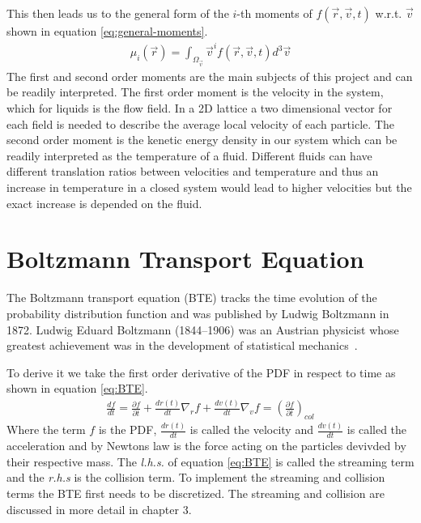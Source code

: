 \documentclass[a4paper,11pt, oneside]{book}
\begin{document}
This then leads us to the general form of the $i$-th moments of $ f(\vec{r},\vec{v},t) $ w.r.t. $ \vec{v} $ shown in equation \ref{eq:general-moments}.
\begin{equation}
  \label{eq:general-moments}
  \begin{aligned}
    \mu_{i}(\vec{r}) =\int_{\Omega_{\vec{v}}}\vec{v}^{i} f(\vec{r},\vec{v},t)d^{3}\vec{v}
  \end{aligned}
\end{equation}
The first and second order moments are the main subjects of this project and can be readily interpreted.
The first order moment is the velocity in the system, which for liquids is the flow field.
In a 2D lattice a two dimensional vector for each field is needed to describe the average local velocity of each particle.
The second order moment is the kenetic energy density in our system which can be readily interpreted as the temperature of a fluid.
Different fluids can have different translation ratios between velocities and temperature and thus an increase in temperature in a closed system would lead to higher velocities but the exact increase is depended on the fluid.


\section{Boltzmann Transport Equation}
The Boltzmann transport equation (BTE) tracks the time evolution of the probability distribution function and was published by Ludwig Boltzmann in 1872. 
Ludwig Eduard Boltzmann (1844–1906) was an Austrian physicist whose greatest achievement was in the development of statistical mechanics~\cite{book}. 

To derive it we take the first order derivative of the PDF in respect to time as shown in
equation \ref{eq:BTE}.
\begin{equation}
  \label{eq:BTE}
  \begin{aligned}
    \frac{df}{dt} =\frac{\partial f}{\partial t} + \frac{dr(t)}{dt} \nabla_{r}f + \frac{dv(t)}{dt} \nabla_{v}f = \left( \frac{\partial f}{\partial t} \right)_{col}
  \end{aligned}
\end{equation}
Where the term $f$ is the PDF, $\frac{dr(t)}{dt}$ is called the velocity and $\frac{dv(t)}{dt}$ is called the acceleration and by Newtons law is the force acting on the particles devivded by their respective mass.
The \textit{l.h.s.} of equation \ref{eq:BTE} is called the streaming term and the \textit{r.h.s} is the collision term.
To implement the streaming and collision terms the BTE first needs to be discretized.
The streaming and collision are discussed in more detail in chapter 3.
\end{document}
